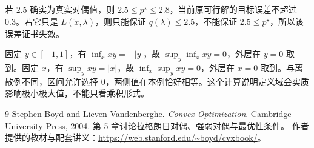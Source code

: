 \documentclass[UTF8,12pt,a4paper,fontset=fandol]{ctexart}
\begin{document}
\begin{solve}
若 $2.5$ 确实为真实对偶值，则 $2.5\leq p^\star\leq2.8$，当前原可行解的目标误差不超过 $0.3$。若它只是 $L(\widetilde x,\lambda)$，则只能保证 $q(\lambda)\leq2.5$，不能保证 $2.5\leq p^\star$，所以该误差证书失效。
\end{solve}

\begin{solve}
固定 $y\in[-1,1]$，有 $\inf_xxy=-|y|$，故 $\sup_y\inf_xxy=0$，外层在 $y=0$ 取到。固定 $x$，有 $\sup_yxy=|x|$，故 $\inf_x\sup_yxy=0$，外层在 $x=0$ 取到。与离散例不同，区间允许选择 $0$，两侧值在本例恰好相等。这个计算说明定义域会实质影响极小极大值，不能只看乘积形式。
\end{solve}

\begin{thebibliography}{9}
Stephen Boyd and Lieven Vandenberghe.
\textit{Convex Optimization}. Cambridge University Press, 2004.
第 5 章讨论拉格朗日对偶、强弱对偶与最优性条件。
作者提供的教材与配套讲义：\url{https://web.stanford.edu/~boyd/cvxbook/}。
\end{thebibliography}
\end{document}
